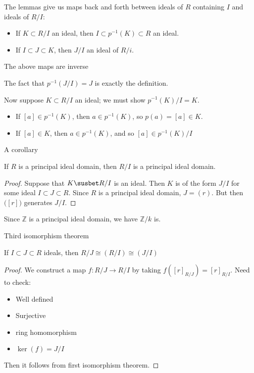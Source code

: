 \documentclass{beamer}
\begin{document}
\begin{frame}
The lemmas give us maps back and forth between ideals of $R$ containing $I$ and ideals of $R/I$:

\begin{itemize}
\item If $K\subset R/I$ an ideal, then $I\subset p^{-1}(K)\subset R$ an ideal.
\item If $I\subset J\subset K$, then $J/I$ an ideal of $R/i$.
\end{itemize}

\begin{lemma}The above maps are inverse

\end{lemma}
The fact that $p^{-1}(J/I)=J$ is exactly the definition.

Now suppose $K\subset R/I$ an ideal; we must show $p^{-1}(K)/I=K$.
\begin{itemize}
\item If $[a]\in p^{-1}(K)$, then $a\in p^{-1}(K)$, so $p(a)=[a]\in K$.
\item If $[a]\in K$, then $a\in p^{-1}(K)$, and so $[a]\in p^{-1}(K)/I$
\end{itemize}
\end{frame}

\begin{frame}{A corollary}

\begin{lemma} If $R$ is a principal ideal domain, then $R/I$ is a principal ideal domain.
\end{lemma}

\begin{proof}
Suppose that $K\susbet R/I$ is an ideal.  Then $K$ is of the form $J/I$ for some ideal $I\subset J\subset R$.  Since $R$ is a principal ideal domain, $J=(r)$.  But then $\big([r]\big)$ generates $J/I$.
\end{proof}

Since $\mathbb{Z}$ is a principal ideal domain, we have $\mathbb{Z}/k$ is.


\end{frame}




\begin{frame}{Third isomorphism theorem}
\begin{theorem}
If $I\subset J\subset R$ ideals, then $R/J\cong (R/I)\cong (J/I)$
\end{theorem}

\begin{proof}
We construct a map $f:R/J\to R/I$ by taking $f([r]_{R/J})=[r]_{R/I}$.
Need to check:
\begin{itemize}
\item Well defined
\item Surjective
\item ring homomorphism
\item $\ker(f)=J/I$
\end{itemize}

Then it follows from first isomorphism theorem.

\end{proof}

\end{frame}
\end{document}
